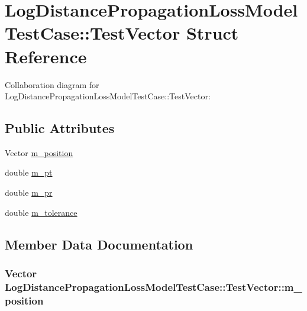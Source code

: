 \hypertarget{structLogDistancePropagationLossModelTestCase_1_1TestVector}{}\section{Log\+Distance\+Propagation\+Loss\+Model\+Test\+Case\+:\+:Test\+Vector Struct Reference}
\label{structLogDistancePropagationLossModelTestCase_1_1TestVector}


Collaboration diagram for Log\+Distance\+Propagation\+Loss\+Model\+Test\+Case\+:\+:Test\+Vector\+:
\subsection*{Public Attributes}
\begin{DoxyCompactItemize}
\item 
Vector \hyperlink{structLogDistancePropagationLossModelTestCase_1_1TestVector_ad635ef52981f72d5b365e922cac44eb3}{m\+\_\+position}
\item 
double \hyperlink{structLogDistancePropagationLossModelTestCase_1_1TestVector_a14279b361ad4258a4021b45fe86a2763}{m\+\_\+pt}
\item 
double \hyperlink{structLogDistancePropagationLossModelTestCase_1_1TestVector_a987953f6c90485980816eb5d9199fe38}{m\+\_\+pr}
\item 
double \hyperlink{structLogDistancePropagationLossModelTestCase_1_1TestVector_ab825820b63f5ce850d6a8e197a47d9d2}{m\+\_\+tolerance}
\end{DoxyCompactItemize}


\subsection{Member Data Documentation}
\subsubsection[{\texorpdfstring{m\+\_\+position}{m_position}}]{\setlength{\rightskip}{0pt plus 5cm}Vector Log\+Distance\+Propagation\+Loss\+Model\+Test\+Case\+::\+Test\+Vector\+::m\+\_\+position}\hypertarget{structLogDistancePropagationLossModelTestCase_1_1TestVector_ad635ef52981f72d5b365e922cac44eb3}{}\label{structLogDistancePropagationLossModelTestCase_1_1TestVector_ad635ef52981f72d5b365e922cac44eb3}
